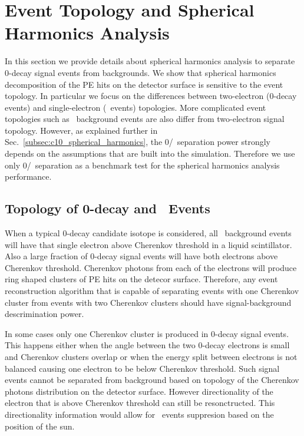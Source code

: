 \section{Event Topology and Spherical Harmonics Analysis}
\label{sec:topology_and_harmonics}

In this section we provide details about spherical harmonics analysis to separate 0\nbb-decay signal events from backgrounds. 
We show that spherical harmonics decomposition of the PE hits on the detector surface is sensitive to the event topology. In particular
we focus on the differences between two-electron (0\nbb-decay events) and single-electron (\B~events) topologies. More complicated 
event topologies such as \C~background events are also differ from two-electron signal topology. However, as explained further in 
Sec.~\ref{subsec:c10_spherical_harmonics}, the 0\nbb/\C~separation power strongly depends on the assumptions that are built into the 
simulation. Therefore we use only 0\nbb/\B~separation as a benchmark test for the spherical harmonics analysis performance.


\subsection{Topology of 0\nbb-decay and \B~Events}
\label{subsec:topology}

When a typical 0\nbb-decay candidate isotope is considered, all \B~background events will have that single electron above Cherenkov threshold
in a liquid scintillator. Also a large fraction of 0\nbb-decay signal events will have both electrons above Cherenkov threshold. Cherenkov photons
from each of the electrons will produce ring shaped clusters of PE hits on the detecor surface. Therefore, any event reconstruction algorithm 
that is capable of separating events with one Cherenkov cluster from events with two Cherenkov clusters should have signal-background 
descrimination power. 

In some cases only one Cherenkov cluster is produced in 0\nbb-decay signal events. This happens either when the angle between the two 
0\nbb-decay electrons is small and Cherenkov clusters overlap or when the energy split between electrons is not balanced causing 
one electron to be below Cherenkov threshold.
Such signal events cannot be separated from background based on topology of the Cherenkov photons distribution on the detector surface. 
However directionality of the electron that is above Cherenkov threshold can still be resonctructed. This directionality information would allow
for \B~events suppresion based on the position of the sun.

